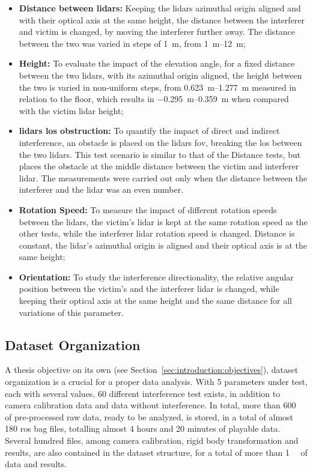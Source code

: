\begin{itemize}
	\item \textbf{Distance between \acp{lidar}:} Keeping the \acp{lidar} azimuthal origin aligned and with their optical axis at the same height, the distance between the interferer and victim is changed, by moving the interferer further away. The distance between the two was varied in steps of \SI{1}{\meter}, from \SIrange{1}{12}{\meter};
\item \textbf{Height:} To evaluate the impact of the elevation angle, for a fixed distance between the two \acp{lidar}, with its azimuthal origin aligned, the height between the two is varied in non-uniform steps, from \SIrange{0.623}{1.277}{\meter} measured in relation to the floor, which results in \SIrange{-0.295}{0.359}{\meter} when compared with the victim \ac{lidar} height;
\item \textbf{\acp{lidar} \ac{los} obstruction:} To quantify the impact of direct and indirect interference, an obstacle is placed on the \acp{lidar} \ac{fov}, breaking the \ac{los} between the two \acp{lidar}. This test scenario is similar to that of the Distance tests, but places the obstacle at the middle distance between the victim and interferer \ac{lidar}. The measurements were carried out only when the distance between the interferer and the \ac{lidar} was an even number.
\item \textbf{Rotation Speed:} To measure the impact of different rotation speeds between the \acp{lidar}, the victim's \ac{lidar} is kept at the same rotation speed as the other tests, while the interferer \ac{lidar} rotation speed is changed. Distance is constant, the \ac{lidar}'s azimuthal origin is aligned and their optical axis is at the same height;
\item \textbf{Orientation:} To study the interference directionality, the relative angular position between the victim's and the interferer \ac{lidar} is changed, while keeping their optical axis at the same height and the same distance for all variations of this parameter.
\end{itemize}


\subsection{Dataset Organization}
A thesis objective on its own (see Section~\ref{sec:introduction:objectives}), dataset organization is a crucial for a proper data analysis. With 5 parameters under test, each with several values, 60 different interference test exists, in addition to camera calibration data and data without interference. In total, more than \SI{600}{\giga\byte} of pre-processed raw data, ready to be analyzed, is stored, in a total of almost 180 \ac{ros} bag files, totalling almost 4 hours and 20 minutes of playable data. Several hundred files, among camera calibration, rigid body transformation and results, are also contained in the dataset structure, for a total of more than \SI{1}{\tera\byte} of data and results.

